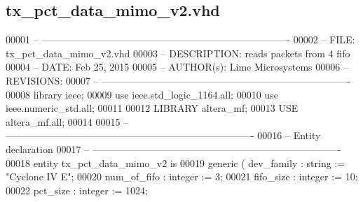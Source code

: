 \subsection{tx\+\_\+pct\+\_\+data\+\_\+mimo\+\_\+v2.\+vhd}
\label{tx__pct__data__mimo__v2_8vhd_source}

\begin{DoxyCode}
00001 \textcolor{keyword}{-- ---------------------------------------------------------------------------- }
00002 \textcolor{keyword}{-- FILE:    tx\_pct\_data\_mimo\_v2.vhd}
00003 \textcolor{keyword}{-- DESCRIPTION: reads packets from 4 fifo}
00004 \textcolor{keyword}{-- DATE:    Feb 25, 2015}
00005 \textcolor{keyword}{-- AUTHOR(s):   Lime Microsystems}
00006 \textcolor{keyword}{-- REVISIONS:}
00007 \textcolor{keyword}{-- ---------------------------------------------------------------------------- }
00008 \textcolor{vhdlkeyword}{library }\textcolor{keywordflow}{ieee};
00009 \textcolor{vhdlkeyword}{use }ieee.std\_logic\_1164.\textcolor{keywordflow}{all};
00010 \textcolor{vhdlkeyword}{use }ieee.numeric\_std.\textcolor{keywordflow}{all};
00011 
00012 \textcolor{vhdlkeyword}{LIBRARY }\textcolor{keywordflow}{altera\_mf};
00013 \textcolor{vhdlkeyword}{USE }\textcolor{keywordflow}{altera\_mf.all};
00014 
00015 \textcolor{keyword}{-- ----------------------------------------------------------------------------}
00016 \textcolor{keyword}{-- Entity declaration}
00017 \textcolor{keyword}{-- ----------------------------------------------------------------------------}
00018 \textcolor{keywordflow}{entity }tx_pct_data_mimo_v2 \textcolor{keywordflow}{is}
00019   \textcolor{keywordflow}{generic} \textcolor{vhdlchar}{(} \textcolor{vhdlchar}{dev_family}  \textcolor{vhdlchar}{:} \textcolor{comment}{string}  \textcolor{vhdlchar}{:=} \textcolor{keyword}{"Cyclone IV E"};
00020                 \textcolor{vhdlchar}{num_of_fifo} \textcolor{vhdlchar}{:} \textcolor{comment}{integer} \textcolor{vhdlchar}{:=} \textcolor{vhdllogic}{}\textcolor{vhdllogic}{3};
00021             \textcolor{vhdlchar}{fifo_size}   \textcolor{vhdlchar}{:} \textcolor{comment}{integer} \textcolor{vhdlchar}{:=} \textcolor{vhdllogic}{}\textcolor{vhdllogic}{10};
00022             \textcolor{vhdlchar}{pct_size}    \textcolor{vhdlchar}{:} \textcolor{comment}{integer} \textcolor{vhdlchar}{:=} \textcolor{vhdllogic}{}\textcolor{vhdllogic}{1024};

\end{DoxyCode}
